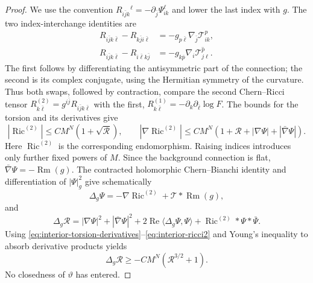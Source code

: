 \begin{proof}
We use the convention
$R_{i\bar j k}{}^\ell=-\partial_{\bar j}\Psi^\ell_{ik}$ and lower the last
index with $g$. The two index-interchange identities are
\[
 \begin{split}
 R_{i\bar j k\bar\ell}-R_{k\bar j i\bar\ell}
 &=-g_{p\bar\ell}\nabla_{\bar j}\mathcal T^p_{ik},\\
 R_{i\bar j k\bar\ell}-R_{i\bar\ell k\bar j}
 &=-g_{k\bar p}\nabla_i\overline{\mathcal T^p_{j\ell}}.
 \end{split}
\]
The first follows by differentiating the antisymmetric part of the
connection; the second is its complex conjugate, using the Hermitian
symmetry of the curvature. Thus both swaps, followed by contraction,
compare the second Chern--Ricci tensor
$R^{(2)}_{k\bar\ell}=g^{i\bar j}R_{i\bar j k\bar\ell}$ with the first,
$R^{(1)}_{k\bar\ell}=-\partial_k\partial_{\bar\ell}\log F$.
The bounds for the torsion and its derivatives give
\begin{equation}\label{eq:interior-ricci2}
  |\operatorname{Ric}^{(2)}|\leq CM^N(1+\sqrt{\mathcal R}),\qquad
  |\nabla\operatorname{Ric}^{(2)}|
  \leq CM^N(1+\mathcal R+|\nabla\Psi|+|\bar\nabla\Psi|).
\end{equation}
Here $\operatorname{Ric}^{(2)}$ is the corresponding endomorphism. Raising indices
introduces only further fixed powers of $M$.
Since the background connection is flat, $\bar\nabla\Psi=-\operatorname{Rm}(g)$. The contracted holomorphic Chern--Bianchi identity and differentiation of $|\Psi|_g^2$ give schematically
\[
  \Delta_g\Psi=-\nabla\operatorname{Ric}^{(2)}+\mathcal T*\operatorname{Rm}(g),
\]
and
\[
  \Delta_g\mathcal R
  =|\nabla\Psi|^2+|\bar\nabla\Psi|^2
   +2\operatorname{Re}\langle\Delta_g\Psi,\Psi\rangle
   +\operatorname{Ric}^{(2)}*\Psi*\bar\Psi.
\]
Using \eqref{eq:interior-torsion-derivatives}--\eqref{eq:interior-ricci2} and Young's inequality to absorb derivative products yields
\begin{equation}\label{eq:interior-calabi-differential}
  \Delta_g\mathcal R\geq-CM^N(\mathcal R^{3/2}+1).
\end{equation}
No closedness of $\vartheta$ has entered.


\end{proof}
